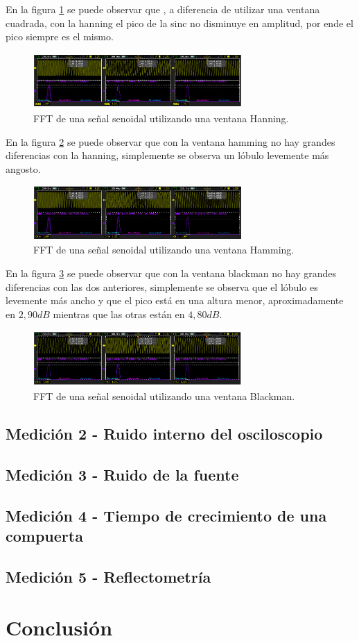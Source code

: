 \documentclass[a4paper,10pt]{article}
\begin{document}
	\indent En la figura \ref{img002} se puede observar que , a diferencia
	de utilizar una ventana cuadrada, con la hanning el pico de la sinc no 
	disminuye en amplitud, por ende el pico siempre es el mismo.

	\begin{figure}[!htb]
		\centering
		\includegraphics[width=8cm]
		{Imagenes/HanningWindow.png}
		\caption{FFT de una señal senoidal utilizando una ventana Hanning.}
		\label{img002}
	\end{figure}

	\indent En la figura \ref{img003} se puede observar que con la ventana 
	hamming no hay grandes diferencias con la hanning, simplemente se observa 
	un lóbulo levemente más angosto.

	\begin{figure}[!htb]
		\centering
		\includegraphics[width=8cm]
		{Imagenes/HammingWindow.png}
		\caption{FFT de una señal senoidal utilizando una ventana Hamming.}
		\label{img003}
	\end{figure}

	\indent En la figura \ref{img004} se puede observar que con la ventana 
	blackman no hay grandes diferencias con las dos anteriores, simplemente se 
	observa que el lóbulo es levemente más ancho y que el pico está en una 
	altura menor, aproximadamente en $2,90dB$ mientras que las otras están en 
	$4,80dB$.

	\begin{figure}[!htb]
		\centering
		\includegraphics[width=8cm]
		{Imagenes/BlackmanWindow.png}
		\caption{FFT de una señal senoidal utilizando una ventana Blackman.}
		\label{img004}
	\end{figure}

	\subsection{Medición 2 - Ruido interno del osciloscopio}
	\subsection{Medición 3 - Ruido de la fuente}
	\subsection{Medición 4 - Tiempo de crecimiento de una compuerta}
	\subsection{Medición 5 - Reflectometría}
	\newpage 
	\section{Conclusión}
\end{document}
